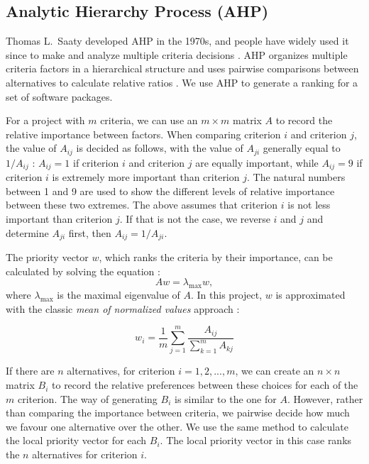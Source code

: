 \documentclass[final, 3p, times, authoryear]{elsarticle}
\begin{document}
\subsection{Analytic Hierarchy Process (AHP)} \label{sec_AHP}

Thomas L.\ Saaty developed AHP in the 1970s, and people have widely used it
since to make and analyze multiple criteria decisions \citep{VaidyaEtAl2006}.
AHP organizes multiple criteria factors in a hierarchical structure and uses
pairwise comparisons between alternatives to calculate relative ratios
\citep{Saaty1990}. We use AHP to generate a ranking for a set of software
packages.

For a project with $m$ criteria, we can use an $m \times m$ matrix $A$ to record
the relative importance between factors. When comparing criterion $i$ and
criterion $j$, the value of $A_{ij}$ is decided as follows, with the value of
$A_{ji}$ generally equal to $1/A_{ij}$ \citep{Saaty1990}: $A_{ij} = 1$ if
criterion $i$ and criterion $j$ are equally important, while $A_{ij} = 9$ if
criterion $i$ is extremely more important than criterion $j$.  The natural
numbers between 1 and 9 are used to show the different levels of relative
importance between these two extremes. The above assumes that criterion $i$ is
not less important than criterion $j$.  If that is not the case, we reverse $i$
and $j$ and determine $A_{ji}$ first, then $A_{ij} = 1/A_{ji}$.

The priority vector $w$, which ranks the criteria by their importance, can be
calculated by solving the equation \citep{Saaty1990}:
\begin{equation} 
    A w = \lambda_{\text{max}} w,
\end{equation}
where $\lambda_{\text{max}}$ is the maximal eigenvalue of $A$.  In this project,
$w$ is approximated with the classic \textit{mean of normalized values} approach
\citep{AlessioEtAl2006}:

\begin{equation}
w_i = \frac{1}{m}\sum_{j=1}^{m}\frac{A_{ij}}{\sum_{k=1}^{m}A_{kj}}
\end{equation}

If there are $n$ alternatives, for criterion $i = 1, 2, ... , m$, we can create
an $n\times n$ matrix $B_i$ to record the relative preferences between these
choices for each of the $m$ criterion. The way of generating $B_i$ is similar to
the one for $A$. However, rather than comparing the importance between criteria,
we pairwise decide how much we favour one alternative over the other. We use the
same method to calculate the local priority vector for each $B_i$.  The local
priority vector in this case ranks the $n$ alternatives for criterion $i$.
\end{document}
